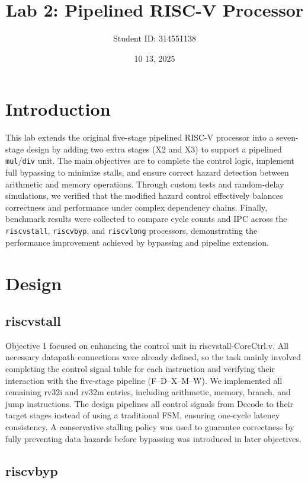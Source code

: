\documentclass[11pt,a4paper]{article}
\begin{document}
\title{Lab 2: Pipelined RISC-V Processor}
\author{Student ID: 314551138}
\date{10 13, 2025}
\maketitle

\section{Introduction}
This lab extends the original five-stage pipelined RISC-V processor into a seven-stage design
by adding two extra stages (X2 and X3) to support a pipelined \texttt{mul}/\texttt{div} unit.
The main objectives are to complete the control logic, implement full bypassing to minimize stalls,
and ensure correct hazard detection between arithmetic and memory operations.
Through custom tests and random-delay simulations, we verified that the modified hazard control
effectively balances correctness and performance under complex dependency chains.
Finally, benchmark results were collected to compare cycle counts and IPC
across the \texttt{riscvstall}, \texttt{riscvbyp}, and \texttt{riscvlong} processors,
demonstrating the performance improvement achieved by bypassing and pipeline extension.

\section{Design}

\subsection{riscvstall}
Objective 1 focused on enhancing the control unit in riscvstall-CoreCtrl.v.
All necessary datapath connections were already defined, so the task mainly involved
completing the control signal table for each instruction and verifying their interaction
with the five-stage pipeline (F–D–X–M–W).
We implemented all remaining rv32i and rv32m entries, including arithmetic, memory,
branch, and jump instructions. The design pipelines all control signals from Decode to their
target stages instead of using a traditional FSM, ensuring one-cycle latency consistency.
A conservative stalling policy was used to guarantee correctness by fully preventing data hazards
before bypassing was introduced in later objectives.
\subsection{riscvbyp}
\end{document}
